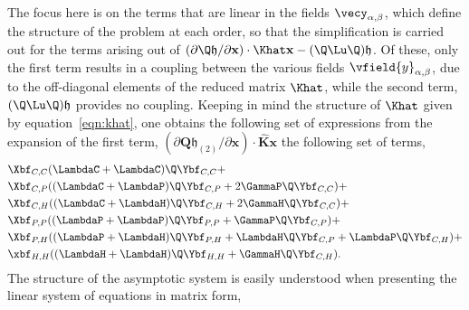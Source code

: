 The focus here is on the terms that are linear in the fields $\vecy_{\alpha,\beta}$, which define the structure of the problem at each order, so that the simplification is carried out for the terms arising out of $(\partial \Q\mathfrak{h}/\partial \mathbf{x})\cdot \Khat\mathbf{x} - (\Q\Lu\Q)\mathfrak{h}$. Of these, only the first term results in a coupling between the various fields $\vfield{y}_{\alpha,\beta}$, due to the off-diagonal elements of the reduced matrix $\Khat$, 
while the second term, $(\Q\Lu\Q)\mathfrak{h}$ provides no coupling. Keeping in mind the structure of $\Khat$ given by equation~\eqref{eqn:khat}, one obtains the following set of expressions from the expansion of the first term, $(\partial \mathbf{Q}\mathfrak{h}_{(2)}/\partial \mathbf{x})\cdot \mathbf{\widehat{K}}\mathbf{x}$ the following set of terms,
\begin{align}
	\begin{split}
		&\Xbf_{C,C}(\LambdaC + \LambdaC)\Q\Ybf_{C,C} + \\
		&\Xbf_{C,P}((\LambdaC + \LambdaP)\Q\Ybf_{C,P} + 2\GammaP\Q\Ybf_{C,C}) + \\
		&\Xbf_{C,H}((\LambdaC + \LambdaH)\Q\Ybf_{C,H} + 2\GammaH\Q\Ybf_{C,C}) + \\
		& \Xbf_{P,P}((\LambdaP + \LambdaP)\Q\Ybf_{P,P} + \GammaP\Q\Ybf_{C,P}) + \\
		& \Xbf_{P,H}((\LambdaP + \LambdaH)\Q\Ybf_{P,H} + \LambdaH\Q\Ybf_{C,P} + \LambdaP\Q\Ybf_{C,H}) + \\
		& \xbf_{H,H}((\LambdaH + \LambdaH)\Q\Ybf_{H,H} + \GammaH\Q\Ybf_{C,H}).
	\end{split}
\end{align}
The structure of the asymptotic system is easily understood when presenting the linear system of equations in matrix form,
